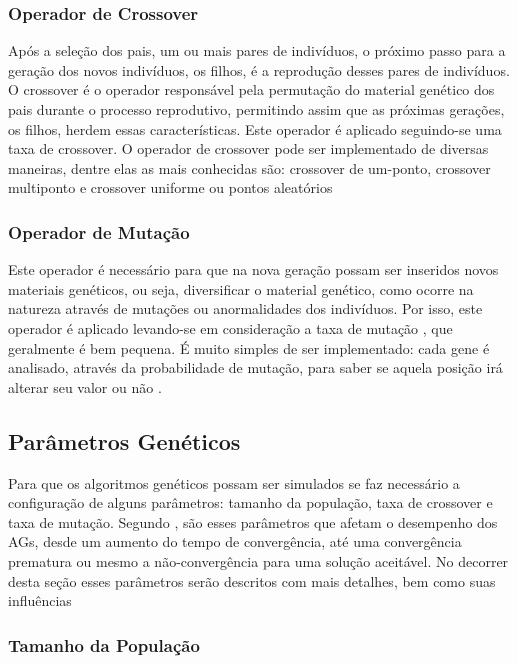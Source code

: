 \subsubsection{Operador de Crossover}

Após a seleção dos pais, um ou mais pares de indivíduos, o próximo passo para a geração dos novos indivíduos, os filhos, é a reprodução desses pares de indivíduos. O crossover é o operador responsável pela permutação do material genético dos pais durante o processo reprodutivo, permitindo assim que as próximas gerações, os filhos, herdem essas características. Este operador é aplicado seguindo-se uma taxa de crossover. O operador de crossover pode ser implementado de diversas maneiras, dentre elas as mais conhecidas são: crossover de um-ponto, crossover multiponto e crossover uniforme ou pontos aleatórios


\subsubsection{Operador de Mutação}
 
Este operador é necessário para que na nova geração possam ser inseridos novos materiais genéticos, ou seja, diversificar o material genético, como ocorre na natureza através de mutações ou anormalidades dos indivíduos. Por isso, este operador é aplicado levando-se em consideração a taxa de mutação , que geralmente é bem pequena. É muito simples de ser implementado: cada gene é analisado, através da probabilidade de mutação, para saber se aquela posição irá alterar seu valor ou não \cite{mognon04}.

\subsection{Parâmetros Genéticos}

Para que os algoritmos genéticos possam ser simulados se faz necessário a configuração de alguns parâmetros: tamanho da população, taxa de crossover e taxa de mutação. Segundo \cite{catarina03}, são esses parâmetros que afetam o desempenho dos AGs, desde um aumento do tempo de convergência, até uma convergência prematura ou mesmo a não-convergência para uma solução aceitável. No decorrer desta seção esses parâmetros serão descritos com mais detalhes, bem como suas influências


\subsubsection{Tamanho da População}


